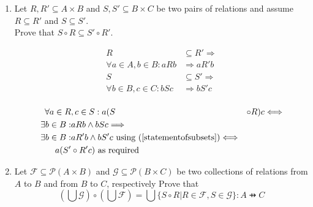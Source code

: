 \documentclass[10pt,\jkfside,a4paper]{article}
\begin{document}
\begin{enumerate}

\item Let $R, R' \subseteq A \times B$ and $S, S' \subseteq B \times C$ be two pairs of relations 
and assume $R \subseteq R'$ and $S \subseteq S'$.\\
Prove that $S \circ R \subseteq S' \circ R'$.

\begin{equation}\label{statementofsubsets}
\begin{split}
R &\subseteq R' \Longrightarrow\\
\forall a \in A, b \in B: a R b &\Longrightarrow a R' b\\
S &\subseteq S' \Longrightarrow\\
\forall b \in B, c \in C: b S c &\Longrightarrow b S' c\\
\end{split}
\end{equation}

\begin{equation}
\begin{split}
\forall a \in R&, c \in S:
a (S &\circ R) c \Longleftrightarrow \\
\exists b \in B: &a R b \wedge b S c \Longrightarrow \\
\exists b \in B: &a R' b \wedge b S' c \text{ using (\ref{statementofsubsets})} \Longleftrightarrow \\
a (S' &\circ R' c) \text{ as required}\\
\end{split}
\end{equation}

\item Let $\mathcal{F} \subseteq \mathcal{P}(A \times B)$ and $\mathcal{G} \subseteq \mathcal{P}(B \times C)$ be two 
collections of relations from $A$ to $B$ and from $B$ to $C$, respectively Prove that
\begin{equation}
\left(\bigcup \mathcal{G}\right)\circ\left(\bigcup \mathcal{F}\right) = \bigcup \{S \circ R | R \in \mathcal{F}, S \in \mathcal{G}\}: A \pfun C
\end{equation}


\end{enumerate}
\end{document}
